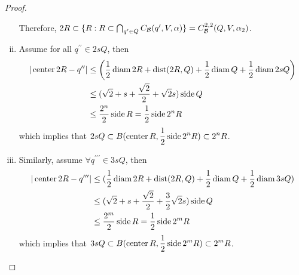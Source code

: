 \begin{proof}
\begin{enumerate}[(i)]
        Therefore, {\color{red}$2R\subset \{R: R\subset \bigcap_{q^\prime\in Q} C_\mathcal B(q^\prime, V, \alpha)\} =  C_\mathcal B^{2,2}(Q, V, \alpha_2)$.}
        \item Assume for all $q^{\prime\prime}\in 2sQ$, then
        \begin{equation*}
            \begin{split}
                |\operatorname{center} 2R - q^{\prime\prime}| &\leq \left(\frac{1}{2}\operatorname{diam} 2R + \operatorname{dist}(2R, Q) + \frac{1}{2}\operatorname{diam} Q + \frac{1}{2}\operatorname{diam} 2sQ\right)\\
                &\leq (\sqrt{2}+s+\frac{\sqrt{2}}{2} + \sqrt{2}s ) \operatorname{side} Q \\
                &\leq \frac{2^n}{2}\operatorname{side} R = \frac{1}{2}\operatorname{side} 2^n R
            \end{split}
        \end{equation*}
        which implies that $\displaystyle 2sQ \subset B(\operatorname{center} R, \frac{1}{2}\operatorname{side} 2^n R)\subset 2^n R$.
        \item Similarly, assume $\forall q^{\prime\prime\prime}\in 3sQ$, then
        \begin{equation*}
            \begin{split}
                |\operatorname{center} 2R - q^{\prime\prime\prime}| &\leq (\frac{1}{2}\operatorname{diam} 2R + \operatorname{dist}(2R, Q) + \frac{1}{2}\operatorname{diam} Q + \frac{1}{2}\operatorname{diam} 3sQ)\\
                &\leq (\sqrt{2}+s+\frac{\sqrt{2}}{2} + \frac{3}{2}\sqrt{2}s ) \operatorname{side} Q \\
                &\leq \frac{2^m}{2}\operatorname{side} R = \frac{1}{2}\operatorname{side} 2^m R
            \end{split}
        \end{equation*}
        which implies that $\displaystyle 3sQ \subset B(\operatorname{center} R, \frac{1}{2}\operatorname{side} 2^m R)\subset 2^m R$.
    \end{enumerate}
\end{proof}


